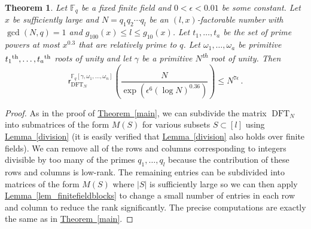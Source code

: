 \documentclass[11pt]{article}
\numberwithin{equation}{section}
\newtheorem{theorem}{Theorem}[section]
\theoremstyle{definition}
\theoremstyle{plain}
\newcommand{\expref}[2]{\hyperref[#2]{#1~\ref{#2}}}
\theoremstyle{definition}
\newcommand\F{{\mathbb{F}}}
\newcommand{\ts}{\textsuperscript}
\DeclareMathOperator{\DFT}{DFT}
\begin{document}
\begin{theorem}\label{factorable_finitefield}
Let $\F_q$ be a fixed finite field and $0 <\epsilon < 0.01$ be some constant.  Let $x$ be sufficiently large and
%
$N = q_1q_2\cdots q_l$ be an
$(l, x)$-factorable number with $\gcd(N,q) = 1$ and $g_{100}(x) \leq l \leq g_{10}(x)$. Let $t_1, \dots , t_a$ be the set of prime powers at most $x^{0.3}$ that are relatively prime to $q$.  Let $\omega_1, \dots , \omega_a$ be primitive
%
$t_1\ts{th}, \dots , t_a\ts{th}$ 
roots of unity and let $\gamma$ be a primitive $N$\ts{th} root of unity.  Then 
%
%
%
%
\[
\textsf{r}^{\F_q[\gamma, \omega_1, \dots , \omega_n]}_{\DFT_N}\left( \frac{N}{\exp\left(\epsilon^6 (\log N)^{0.36}\right)} \right) \leq N^{ 7 \epsilon} \,.
\]
%
\end{theorem}
\begin{proof}
As in the proof of \expref{Theorem}{main}, we can subdivide the matrix $\DFT_N$ into submatrices of the form $M(S)$ for various subsets $S \subset [l]$ using \expref{Lemma}{division} (it is easily verified that \expref{Lemma}{division} also holds over finite fields).  We can remove all of the rows and columns corresponding to integers divisible by too many of the primes $q_1, \dots , q_l$ because the contribution of these rows and columns is low-rank.  The remaining entries can be subdivided into matrices of the form $M(S)$ where $|S|$ is sufficiently large so we can then apply \expref{Lemma}{lem_finitefieldblocks} to change a small number of entries in each row and column to reduce the rank significantly.  The precise computations are exactly the same as in \expref{Theorem}{main}.
\end{proof}
\end{document}
